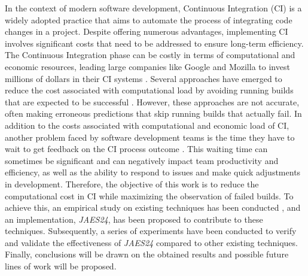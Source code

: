 \vspace{2cm}

In the context of modern software development, Continuous Integration (CI) is a widely adopted
practice that aims to automate the process of integrating code changes in a project. Despite
offering numerous advantages, implementing CI involves significant costs that need to be addressed
to ensure long-term efficiency. The Continuous Integration phase can be costly in terms of
computational and economic resources, leading large companies like Google and Mozilla to invest
millions of dollars in their CI systems \cite{1}. Several approaches have emerged to reduce the
cost associated with computational load by avoiding running builds that are expected to be
successful \cite{2}. However, these approaches are not accurate, often making erroneous
predictions that skip running builds that actually fail. In addition to the costs associated with
computational and economic load of CI, another problem faced by software development teams is the
time they have to wait to get feedback on the CI process outcome \cite{3}. This waiting time can
sometimes be significant and can negatively impact team productivity and efficiency, as well as
the ability to respond to issues and make quick adjustments in development. Therefore, the
objective of this work is to reduce the computational cost in CI while maximizing the observation
of failed builds. To achieve this, an empirical study on existing techniques has been conducted
\cite{2,4,5,6,7,8}, and an implementation, \textit{JAES24}, has been proposed to contribute to
these techniques. Subsequently, a series of experiments have been conducted to verify and validate
the effectiveness of \textit{JAES24} compared to other existing techniques. Finally, conclusions
will be drawn on the obtained results and possible future lines of work will be proposed.

\vspace{0.5cm}

\vfill
